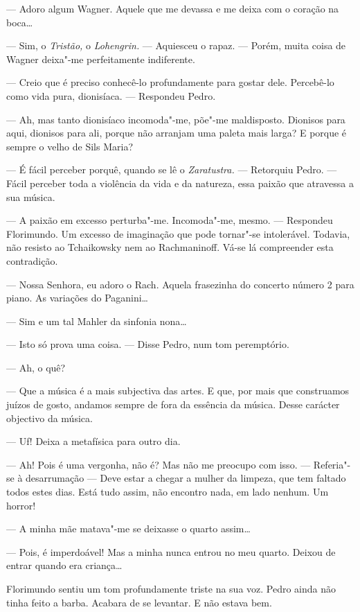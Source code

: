 --- Adoro algum Wagner. Aquele que me devassa e me deixa com o coração na
boca\ldots{}

--- Sim, o \emph{Tristão, }o \emph{Lohengrin. }--- Aquiesceu o rapaz. ---
Porém, muita coisa de Wagner deixa"-me perfeitamente indiferente.

--- Creio que é preciso conhecê-lo profundamente para gostar dele.
Percebê-lo como vida pura, dionisíaca. ---  Respondeu Pedro.

--- Ah, mas tanto dionisíaco incomoda"-me, põe"-me maldisposto. Dionisos
para aqui, dionisos para ali, porque não arranjam uma paleta mais larga?
E porque é sempre o velho de Sils Maria?

--- É fácil perceber porquê, quando se lê o \emph{Zaratustra. }--- Retorquiu
Pedro. --- Fácil perceber toda a violência da vida e da natureza, essa
paixão que atravessa a sua música.

--- A paixão em excesso perturba"-me. Incomoda"-me, mesmo. --- Respondeu
Florimundo. Um excesso de imaginação que pode tornar"-se intolerável.
Todavia, não resisto ao Tchaikowsky nem ao Rachmaninoff. Vá-se lá
compreender esta contradição.

--- Nossa Senhora, eu adoro o Rach. Aquela frasezinha do concerto número 2
para piano. As variações do Paganini\ldots{}

--- Sim e um tal Mahler da sinfonia nona\ldots{}

--- Isto só prova uma coisa. --- Disse Pedro, num tom peremptório.

--- Ah, o quê?

--- Que a música é a mais subjectiva das artes. E que, por mais que
construamos juízos de gosto, andamos sempre de fora da essência da
música. Desse carácter objectivo da música.

--- Uf! Deixa a metafísica para outro dia.

--- Ah! Pois é uma vergonha, não é? Mas não me preocupo com isso. --- 
Referia"-se à desarrumação --- Deve estar a chegar a mulher da limpeza, que
tem faltado todos estes dias. Está tudo assim, não encontro nada, em
lado nenhum. Um horror!

--- A minha mãe matava"-me se deixasse o quarto assim\ldots{}

--- Pois, é imperdoável! Mas a minha nunca entrou no meu quarto. Deixou de
entrar quando era criança\ldots{}

Florimundo sentiu um tom profundamente triste na sua voz. Pedro ainda
não tinha feito a barba. Acabara de se levantar. E não estava bem.


